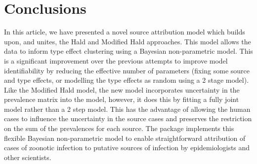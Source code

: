 \section{Conclusions} \label{conclusion_section}

In this article, we have presented a novel source attribution model which builds upon, and unites, the Hald and Modified Hald approaches. This model allows the data to inform type effect clustering 
using a Bayesian non-parametric model. This is a significant improvement over 
the previous attempts to improve model identifiability by reducing the effective number of parameters (fixing some source and type effects, or modelling the type effects as random using a 2 stage 
model).  Like the Modified Hald model, the new model incorporates uncertainty in the prevalence matrix into the model, however, it does this by fitting a fully joint model rather than a 2 step model. This 
has the advantage of allowing the human cases to influence the uncertainty in the source cases and preserves the restriction on the sum of the prevalences for each source. The  package implements this flexible Bayesian non-parametric model to enable straightforward attribution of cases of zoonotic infection to putative sources of infection by epidemiologists and other scientists.